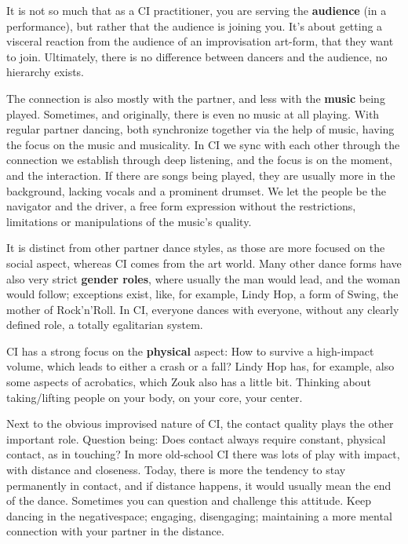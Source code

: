It is not so much that as a CI practitioner, you are serving the \textbf{audience} (in a performance), but rather that the audience is joining you.
It's about getting a visceral reaction from the audience of an improvisation art-form, that they want to join.
Ultimately, there is no difference between dancers and the audience, no hierarchy exists.

The connection is also mostly with the partner, and less with the \textbf{music} being played.
Sometimes, and originally, there is even no music at all playing.
With regular partner dancing, both synchronize together via the help of music, having the focus on the music and musicality.
In CI we sync with each other through the connection we establish through deep listening, and the focus is on the moment, and the interaction.
If there are songs being played, they are usually more in the background, lacking vocals and a prominent drumset.
We let the people be the navigator and the driver, a free form expression without the restrictions, limitations or manipulations of the music's quality.

It is distinct from other partner dance styles, as those are more focused on the social aspect, whereas CI comes from the art world.
Many other dance forms have also very strict \textbf{gender roles}, where usually the man would lead, and the woman would follow; exceptions exist, like, for example, Lindy Hop, a form of Swing, the mother of Rock'n'Roll.
In CI, everyone dances with everyone, without any clearly defined role, a totally egalitarian system.

CI has a strong focus on the \textbf{physical} aspect: How to survive a high-impact volume, which leads to either a crash or a fall?
Lindy Hop has, for example, also some aspects of acrobatics, which Zouk also has a little bit.
Thinking about taking/lifting people on your body, on your core, your center.

Next to the obvious improvised nature of CI, the contact quality plays the other important role.
Question being: Does contact always require constant, physical contact, as in touching?
In more old-school CI there was lots of play with impact, with distance and closeness.
Today, there is more the tendency to stay permanently in contact, and if distance happens, it would usually mean the end of the dance.
Sometimes you can question and challenge this attitude.
Keep dancing in the \gls{negativespace}; engaging, disengaging; maintaining a more mental connection with your partner in the distance.

